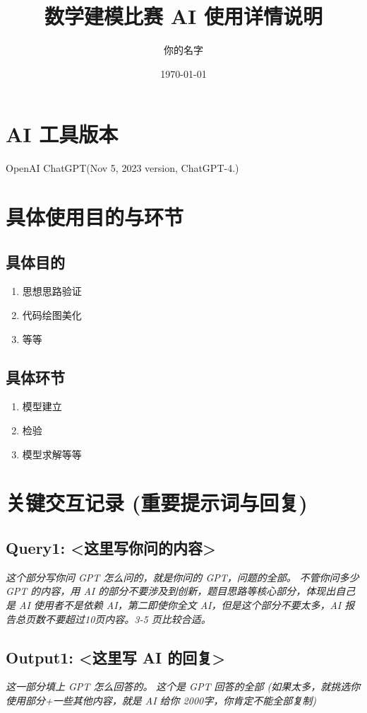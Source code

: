 \documentclass{article}
\title{数学建模比赛 AI 使用详情说明}
\author{你的名字}
\date{\today}
\begin{document}
\maketitle

\section*{AI 工具版本}
\noindent OpenAI ChatGPT(Nov 5, 2023 version, ChatGPT-4.)

\section*{具体使用目的与环节}
\subsection*{具体目的}
\begin{enumerate}
    \item 思想思路验证
    \item 代码绘图美化
    \item 等等
\end{enumerate}

\subsection*{具体环节}
\begin{enumerate}
    \item 模型建立
    \item 检验
    \item 模型求解等等
\end{enumerate}

\section*{关键交互记录 (重要提示词与回复)}
\subsection*{Query1: <这里写你问的内容>}
\textit{这个部分写你问 GPT 怎么问的，就是你问的 GPT，问题的全部。}
\textit{不管你问多少 GPT 的内容，用 AI 的部分不要涉及到创新，题目思路等核心部分，体现出自己是 AI 使用者不是依赖 AI，第二即使你全文 AI，但是这个部分不要太多，AI 报告总页数不要超过10页内容。3-5 页比较合适。}

\subsection*{Output1: <这里写 AI 的回复>}
\textit{这一部分填上 GPT 怎么回答的。}
\textit{这个是 GPT 回答的全部 (如果太多，就挑选你使用部分+一些其他内容，就是 AI 给你 2000字，你肯定不能全部复制)}
\end{document}

